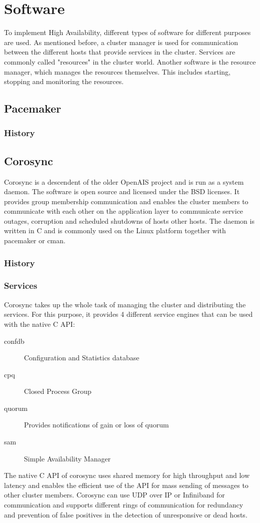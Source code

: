 \section{Software}
To implement High Availability, different types of software for different purposes are used.
As mentioned before, a cluster manager is used for communication between the different hosts that
provide services in the cluster. Services are commonly called "resources" in the cluster world.
Another software is the resource manager, which manages the resources themselves.
This includes starting, stopping and monitoring the resources.
\subsection{Pacemaker}
\subsubsection{History}
\subsection{Corosync}
Corosync is a descendent of the older OpenAIS project and is run as a system daemon. The software is open source and licensed under the BSD licenses. It provides group membership communication and enables the cluster members to communicate with each other on the application layer to communicate service outages, corruption and scheduled shutdowns of hosts other hosts. The daemon is written in C and is commonly used on the Linux platform together with pacemaker or cman.
\subsubsection{History}
\subsubsection{Services}
Corosync takes up the whole task of managing the cluster and distributing the services. For this purpose, it provides 4 different service engines that can be used with the native C \ac{API}:
\begin{description}
\item [confdb] Configuration and Statistics database
\item [cpq] Closed Process Group
\item [quorum] Provides notifications of gain or loss of quorum
\item [sam] Simple Availability Manager
\end{description}
The native C API of corosync uses shared memory for high throughput and low latency and enables the efficient use of the API for mass sending of messages to other cluster members.
\linebreak[3]
Corosync can use UDP over IP or Infiniband for communication and supports different rings of communication for redundancy and prevention of false positives in the detection of unresponsive or dead hosts.
